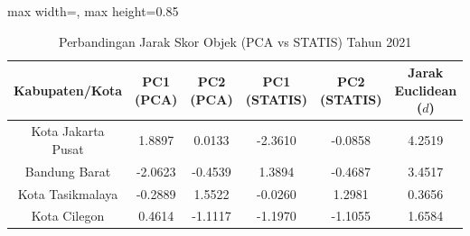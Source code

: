 \begin{table}[H]
\centering
\caption{Perbandingan Jarak Skor Objek (PCA vs STATIS) Tahun 2021} \label{tab:sample1jarak_skor_2021}
\begin{adjustbox}{max width=\textwidth, max height=0.85\textheight}
\begin{tabular}{|c|c|c|c|c|c|}
\hline
\textbf{Kabupaten/Kota} & \textbf{PC1 (PCA)} & \textbf{PC2 (PCA)} & \textbf{PC1 (STATIS)} & \textbf{PC2 (STATIS)} & \textbf{Jarak Euclidean ($d$)} \\
\hline
Kota Jakarta Pusat & 1.8897 & 0.0133 & -2.3610 & -0.0858 & 4.2519 \\
Bandung Barat & -2.0623 & -0.4539 & 1.3894 & -0.4687 & 3.4517 \\
Kota Tasikmalaya & -0.2889 & 1.5522 & -0.0260 & 1.2981 & 0.3656 \\
Kota Cilegon & 0.4614 & -1.1117 & -1.1970 & -1.1055 & 1.6584 \\
\hline
\end{tabular}
\end{adjustbox}
\end{table}